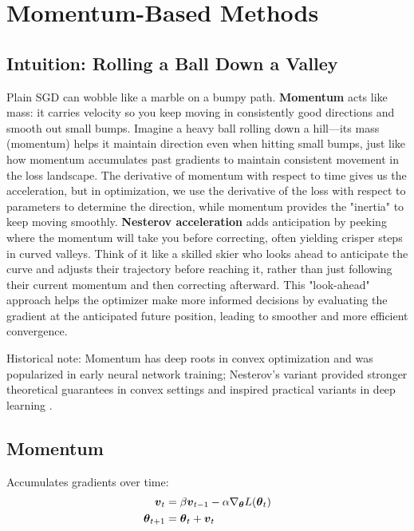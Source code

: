 
\section{Momentum-Based Methods }
\label{sec:momentum}

\subsection{Intuition: Rolling a Ball Down a Valley}

Plain SGD can wobble like a marble on a bumpy path. \textbf{Momentum} acts like mass: it carries velocity so you keep moving in consistently good directions and smooth out small bumps. Imagine a heavy ball rolling down a hill—its mass (momentum) helps it maintain direction even when hitting small bumps, just like how momentum accumulates past gradients to maintain consistent movement in the loss landscape. The derivative of momentum with respect to time gives us the acceleration, but in optimization, we use the derivative of the loss with respect to parameters to determine the direction, while momentum provides the "inertia" to keep moving smoothly. \textbf{Nesterov acceleration} adds anticipation by peeking where the momentum will take you before correcting, often yielding crisper steps in curved valleys. Think of it like a skilled skier who looks ahead to anticipate the curve and adjusts their trajectory before reaching it, rather than just following their current momentum and then correcting afterward. This "look-ahead" approach helps the optimizer make more informed decisions by evaluating the gradient at the anticipated future position, leading to smoother and more efficient convergence.

Historical note: Momentum has deep roots in convex optimization and was popularized in early neural network training; Nesterov's variant provided stronger theoretical guarantees in convex settings and inspired practical variants in deep learning \cite{Polyak1964,Nesterov1983,GoodfellowEtAl2016,Bishop2006}.

\subsection{Momentum}

Accumulates gradients over time:
\begin{align}
\boldsymbol{v}_t &= \beta \boldsymbol{v}_{t-1} - \alpha \nabla_{\boldsymbol{\theta}} L(\boldsymbol{\theta}_t) \\
\boldsymbol{\theta}_{t+1} &= \boldsymbol{\theta}_t + \boldsymbol{v}_t
\end{align}

